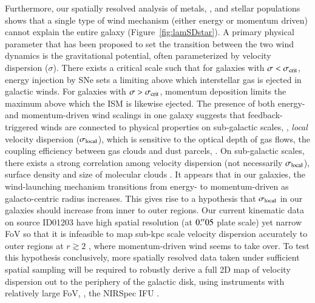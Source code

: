 Furthermore, our spatially resolved analysis of metals, \SFR, and stellar populations shows that a single type of wind mechanism 
(either energy or momentum driven) cannot explain the entire galaxy (Figure~\ref{fig:lamSDstar}).
A primary physical parameter that has been proposed to set the transition between the two wind dynamics is the gravitational 
potential, often parameterized by velocity dispersion ($\sigma$). There exists a critical scale \scrit 
\citep{Murray:2005jt} such that for galaxies with $\sigma<\sigma_{\rm crit}$, energy injection by SNe sets a limiting 
\SFR above which interstellar gas is ejected in galactic winds. For galaxies with $\sigma>\sigma_{\rm crit}$, momentum 
deposition limits the maximum \SFR above which the ISM is likewise ejected.
The presence of both energy- and momentum-driven wind scalings in one galaxy suggests that feedback-triggered winds are connected
to physical properties on sub-galactic scales, \eg, \emph{local} velocity dispersion ($\sigma_{\rm local}$), 
which is sensitive to the optical depth of gas flows, the coupling efficiency between gas clouds and dust 
parcels, \etc.
On sub-galactic scales, there exists a strong correlation among velocity dispersion (not necessarily 
$\sigma_{\rm local}$), surface density and size of molecular clouds \cite[see][and references 
therein]{BallesterosParedes:2011gk}.
It appears that in our galaxies, the wind-launching mechanism transitions from energy- to momentum-driven as 
galacto-centric radius increases.
This gives rise to a hypothesis that $\sigma_{\rm local}$ in our galaxies should increase from inner to outer 
regions.
Our current kinematic data on source ID01203 have high spatial resolution (at $0\mbox{$.\!^{\prime\prime}$}05$ plate scale) yet narrow FoV so that it 
is infeasible to map sub-kpc scale velocity dispersion accurately to outer regions at $r\gtrsim2$ \kpc, where momentum-driven wind 
seems to take over.
To test this hypothesis conclusively, more spatially resolved data taken under sufficient spatial sampling will be required to 
robustly derive a full 2D map of velocity dispersion out to the periphery of the galactic disk, using instruments 
with relatively large FoV, \eg, the \jwst NIRSpec IFU \citep{Kalirai:2018gs}.

